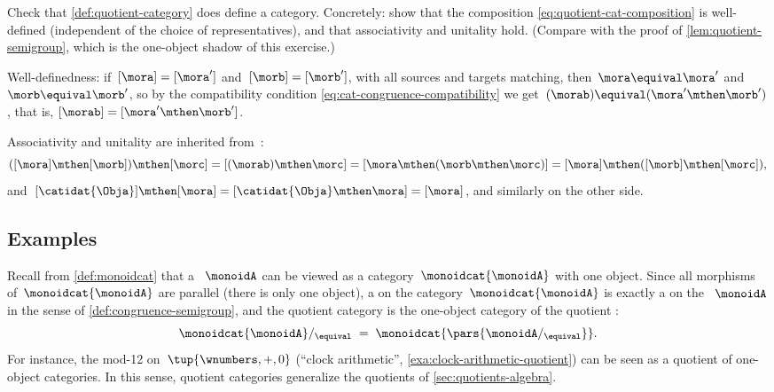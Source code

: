 \begin{exercise}
    \label{ex:quotient-cat-well-defined}
    Check that \cref{def:quotient-category} does define a category.
    Concretely: show that the composition \cref{eq:quotient-cat-composition} is well-defined (independent of the choice of representatives), and that associativity and unitality hold.
    (Compare with the proof of \cref{lem:quotient-semigroup}, which is the one-object shadow of this exercise.)
\end{exercise}
\begin{solution}
    Well-definedness: if~$[\mora] = [\mora']$ and~$[\morb] = [\morb']$, with all sources and targets matching, then~$\mora \equival \mora'$ and~$\morb \equival \morb'$, so by the compatibility condition \cref{eq:cat-congruence-compatibility} we get~$(\morab) \equival (\mora' \mthen \morb')$, that is, $[\morab] = [\mora' \mthen \morb']$.

    Associativity and unitality are inherited from~\CatC:
    \begin{equation}
        ([\mora] \mthen [\morb]) \mthen [\morc]
        = [(\morab) \mthen \morc]
        = [\mora \mthen (\morb \mthen \morc)]
        = [\mora] \mthen ([\morb] \mthen [\morc]),
    \end{equation}
    and~$[\catidat{\Obja}] \mthen [\mora] = [\catidat{\Obja} \mthen \mora] = [\mora]$, and similarly on the other side.
\end{solution}

\subsection{Examples}

\begin{example}
    \label{exa:quotient-cat-monoid}
    Recall from \cref{def:monoidcat} that a ~$\monoidA$ can be viewed as a category~$\monoidcat{\monoidA}$ with one object.
    Since all morphisms of~$\monoidcat{\monoidA}$ are parallel (there is only one object), a  on the category~$\monoidcat{\monoidA}$ is exactly a  on the ~$\monoidA$ in the sense of \cref{def:congruence-semigroup}, and the quotient category is the one-object category of the quotient :
    \begin{equation}
        \monoidcat{\monoidA} /_{\equival} \; = \; \monoidcat{\pars{\monoidA /_{\equival}}}.
    \end{equation}
    For instance, the mod-12  on~$\tup{\wnumbers, +, 0}$ (``clock arithmetic'', \cref{exa:clock-arithmetic-quotient}) can be seen as a quotient of one-object categories.
    In this sense, quotient categories generalize the quotients of \cref{sec:quotients-algebra}.
\end{example}

